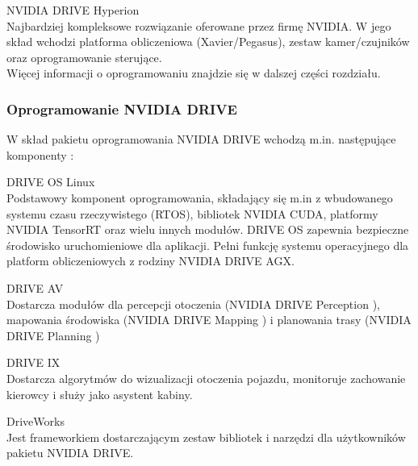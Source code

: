 \begin{enumerate*}
\newpage
\item NVIDIA DRIVE Hyperion \\
Najbardziej kompleksowe rozwiązanie oferowane przez firmę NVIDIA. W jego skład wchodzi platforma obliczeniowa (Xavier/Pegasus), zestaw kamer/czujników oraz oprogramowanie sterujące. \\
Więcej informacji o oprogramowaniu znajdzie się w dalszej części rozdziału.
\end{enumerate*}

\subsubsection{Oprogramowanie NVIDIA DRIVE}
W skład pakietu oprogramowania NVIDIA DRIVE wchodzą m.in. następujące komponenty \cite{nvidia:drive:software}:
\begin{enumerate*}
\item DRIVE OS Linux \\
Podstawowy komponent oprogramowania, składający się m.in z wbudowanego systemu czasu rzeczywistego (RTOS), bibliotek NVIDIA CUDA, platformy NVIDIA TensorRT \cite{nvidia:tensorRT} oraz wielu innych modułów. DRIVE OS zapewnia bezpieczne środowisko uruchomieniowe dla aplikacji. Pełni funkcję systemu operacyjnego dla platform obliczeniowych z rodziny NVIDIA DRIVE AGX.
\item DRIVE AV \\
Dostarcza modułów dla percepcji otoczenia (NVIDIA DRIVE Perception \cite{nvidia:drivePerception}), mapowania środowiska (NVIDIA DRIVE Mapping \cite{nvidia:driveMapping}) i planowania trasy (NVIDIA DRIVE Planning \cite{nvidia:drivePlanning})
\item DRIVE IX \\
Dostarcza algorytmów do wizualizacji otoczenia pojazdu, monitoruje zachowanie kierowcy i służy jako asystent kabiny.
\item DriveWorks \\
Jest frameworkiem dostarczającym zestaw bibliotek i narzędzi dla użytkowników pakietu NVIDIA DRIVE.
\end{enumerate*}
